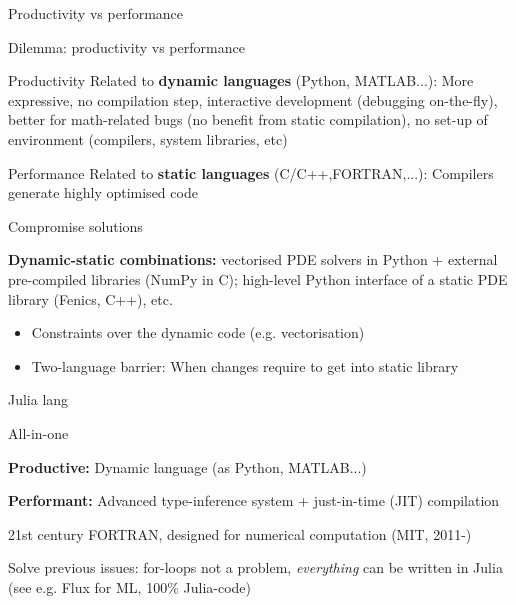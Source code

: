 \begin{frame}{Productivity vs performance}

Dilemma: productivity vs performance

\begin{block}{Productivity}
Related to \textbf{dynamic languages} (Python, MATLAB...): More expressive, no compilation step, interactive development (debugging on-the-fly), better for math-related bugs (no benefit from static compilation), no set-up of environment (compilers, system libraries, etc)
\end{block}

\begin{block}{Performance}
Related to \textbf{static languages} (C/C++,FORTRAN,...): Compilers generate highly optimised code
\end{block}

\end{frame}

\begin{frame}{Compromise solutions}

\textbf{Dynamic-static combinations:} vectorised PDE solvers in Python + external pre-compiled libraries (NumPy in C); high-level Python interface of a static PDE library (Fenics, C++), etc.

\begin{itemize}
  \item Constraints over the dynamic code (e.g. vectorisation)
  \item Two-language barrier: When changes require to get into static library
\end{itemize}

\end{frame}

\begin{frame}{Julia lang}

\begin{block}{All-in-one}

\textbf{Productive:} Dynamic language (as Python, MATLAB...)

\textbf{Performant:} Advanced type-inference system + just-in-time (JIT) compilation

\end{block}

21st century FORTRAN, designed for numerical computation (MIT, 2011-)

Solve previous issues: for-loops not a problem, \emph{everything} can be written in Julia (see e.g. Flux for ML, 100$\%$ Julia-code)


\end{frame}

